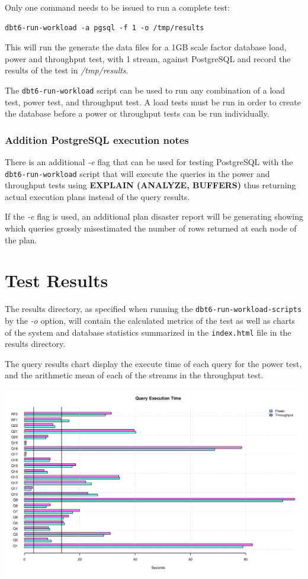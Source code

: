 \documentclass{article}
\begin{document}
Only one command needs to be issued to run a complete test:
\lstset{language=sh}
\begin{lstlisting}
dbt6-run-workload -a pgsql -f 1 -o /tmp/results
\end{lstlisting}

This will run the generate the data files for a 1GB scale factor database load,
power and throughput test, with 1 stream, against PostgreSQL and record the
results of the test in \textit{/tmp/results}.

The \texttt{dbt6-run-workload} script can be used to run any combination of a
load test, power test, and throughput test.  A load tests must be run in order
to create the database before a power or throughput tests can be run
individually.

\subsubsection{Addition PostgreSQL execution notes}

There is an additional \textit{-e} flag that can be used for testing PostgreSQL
with the \texttt{dbt6-run-workload} script that will execute the queries in the
power and throughput tests using \textbf{EXPLAIN (ANALYZE, BUFFERS)} thus
returning actual execution plans instead of the query results.

If the \textit{-e} flag is used, an additional plan disaster report will be
generating showing which queries grossly misestimated the number of rows
returned at each node of the plan.

\section{Test Results}

The results directory, as specified when running the
\texttt{dbt6-run-workload-scripts} by the \textit{-o} option, will contain the
calculated metrics of the test as well as charts of the system and database
statistics summarized in the \texttt{index.html} file in the results directory.

The query results chart display the execute time of each query for the power
test, and the arithmetic mean of each of the streams in the throughput test.

\begin{center}
  \includegraphics[scale=0.5]{q_time.png}
\end{center}
\end{document}
